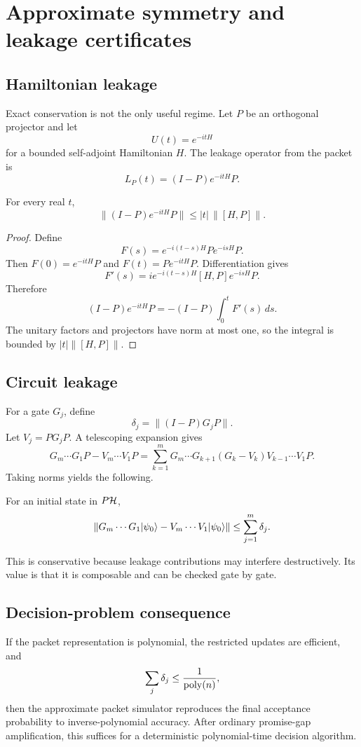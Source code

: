 \chapter{Approximate symmetry and leakage certificates}
\label{ch:approximate-symmetry}

\section{Hamiltonian leakage}
Exact conservation is not the only useful regime. Let $P$ be an orthogonal projector and let
\[
U(t)=e^{-itH}
\]
for a bounded self-adjoint Hamiltonian $H$. The leakage operator from the packet is
\[
L_P(t)=(I-P)e^{-itH}P.
\]

\begin{theorem}
\label{thm:commutator-leakage}
For every real $t$,
\[
\|(I-P)e^{-itH}P\|
\le
|t|\,\|[H,P]\|.
\]
\end{theorem}

\begin{proof}
Define
\[
F(s)=e^{-i(t-s)H}Pe^{-isH}P.
\]
Then $F(0)=e^{-itH}P$ and $F(t)=Pe^{-itH}P$. Differentiation gives
\[
F'(s)=ie^{-i(t-s)H}[H,P]e^{-isH}P.
\]
Therefore
\[
(I-P)e^{-itH}P
=-(I-P)\int_0^tF'(s)\,ds.
\]
The unitary factors and projectors have norm at most one, so the integral is bounded by $|t|\|[H,P]\|$.
\end{proof}

\section{Circuit leakage}
For a gate $G_j$, define
\[
\delta_j=\|(I-P)G_jP\|.
\]
Let $V_j=PG_jP$. A telescoping expansion gives
\[
G_m\cdots G_1P-V_m\cdots V_1P
=
\sum_{k=1}^m
G_m\cdots G_{k+1}(G_k-V_k)V_{k-1}\cdots V_1P.
\]
Taking norms yields the following.

\begin{proposition}
\label{prop:sum-leakage}
For an initial state in $P\mathcal H$,
\[
\|G_m\cdots G_1\lvert \psi_0\rangle
-
V_m\cdots V_1\lvert \psi_0\rangle\|
\le
\sum_{j=1}^m\delta_j.
\]
\end{proposition}

This is conservative because leakage contributions may interfere destructively. Its value is that it is composable and can be checked gate by gate.

\section{Decision-problem consequence}
If the packet representation is polynomial, the restricted updates are efficient, and
\[
\sum_j\delta_j\le\frac1{\operatorname{poly}(n)},
\]
then the approximate packet simulator reproduces the final acceptance probability to inverse-polynomial accuracy. After ordinary promise-gap amplification, this suffices for a deterministic polynomial-time decision algorithm.

